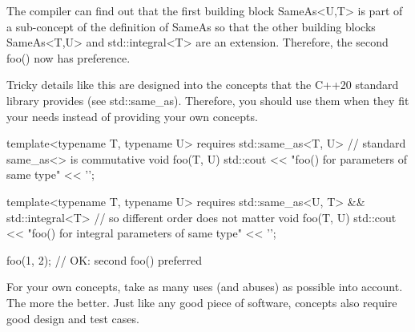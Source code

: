 The compiler can find out that the first building block SameAs<U,T> is part of a sub-concept of the definition of SameAs so that the other building blocks SameAs<T,U> and std::integral<T> are an extension. Therefore, the second foo() now has preference.

Tricky details like this are designed into the concepts that the C++20 standard library provides (see std::same\_as). Therefore, you should use them when they fit your needs instead of providing your own concepts.

\begin{cpp}
template<typename T, typename U>
requires std::same_as<T, U> // standard same_as<> is commutative
void foo(T, U)
{
	std::cout << "foo() for parameters of same type" << '\n';
}

template<typename T, typename U>
requires std::same_as<U, T> && std::integral<T> // so different order does not matter
void foo(T, U)
{
	std::cout << "foo() for integral parameters of same type" << '\n';
}

foo(1, 2); // OK: second foo() preferred
\end{cpp}

For your own concepts, take as many uses (and abuses) as possible into account. The more the better. Just like any good piece of software, concepts also require good design and test cases.












